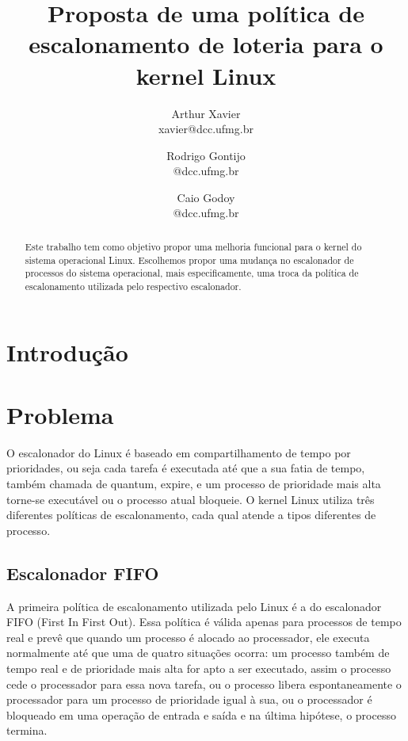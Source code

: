 \documentclass[a4paper,12pt]{article}
\title{Proposta de uma política de escalonamento de loteria para o kernel Linux}
\author{
    Arthur Xavier\\
    \small{xavier@dcc.ufmg.br}
    \and
    Rodrigo Gontijo\\
    \small{@dcc.ufmg.br}
    \and
    Caio Godoy\\
    \small{@dcc.ufmg.br}
}
\begin{document}
\maketitle

\begin{abstract}
  Este trabalho tem como objetivo propor uma melhoria funcional para o kernel do sistema operacional Linux. Escolhemos propor uma mudança no escalonador de processos do sistema operacional, mais especificamente, uma troca da política de escalonamento utilizada pelo respectivo escalonador.
\end{abstract}

\section{Introdução}

\pagebreak

\section{Problema}
O escalonador do Linux é baseado em compartilhamento de tempo por prioridades, ou seja cada tarefa é executada até que a sua fatia de tempo, também chamada de quantum, expire, e um processo de prioridade mais alta torne-se executável ou o processo atual bloqueie. O kernel Linux utiliza três diferentes políticas de escalonamento, cada qual atende a tipos diferentes de processo.

\subsection{Escalonador FIFO}
A primeira política de escalonamento utilizada pelo Linux é a do escalonador FIFO (First In First Out). Essa política é válida apenas para processos de tempo real e prevê que quando um processo é alocado ao processador, ele executa normalmente até que uma de quatro situações ocorra: um processo também de tempo real e de prioridade mais alta for apto a ser executado, assim o processo cede o processador para essa nova tarefa, ou o processo libera espontaneamente o processador para um processo de prioridade igual à sua, ou o processador é bloqueado em uma operação de entrada e saída e na última hipótese, o processo termina. \cite{Oliveira2008}
\end{document}
